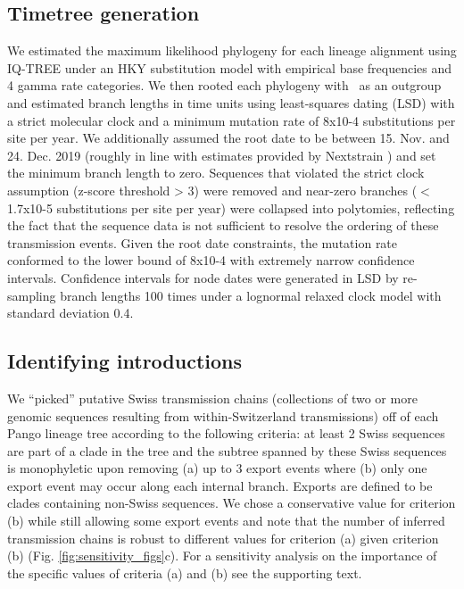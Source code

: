 \documentclass[11pt,twoside,lineno]{pnas-new} %
\begin{document}
\subsection*{Timetree generation}
We estimated the maximum likelihood phylogeny for each lineage alignment using IQ-TREE \cite{Nguyen2014} under an HKY substitution model \cite{Hasegawa1985} with empirical base frequencies and 4 gamma rate categories. We then rooted each phylogeny with \outgroupgisaidepiisls\ as an outgroup and estimated branch lengths in time units using least-squares dating (LSD) \cite{To2016} with a strict molecular clock and a minimum mutation rate of 8x10-4 substitutions per site per year. We additionally assumed the root date to be between 15. Nov. and 24. Dec. 2019 (roughly in line with estimates provided by Nextstrain \cite{Nextstrainteam}) and set the minimum branch length to zero. Sequences that violated the strict clock assumption (z-score threshold > 3) were removed and near-zero branches ($<$1.7x10-5 substitutions per site per year) were collapsed into polytomies, reflecting the fact that the sequence data is not sufficient to resolve the ordering of these transmission events. Given the root date constraints, the mutation rate conformed to the lower bound of 8x10-4 with extremely narrow confidence intervals. Confidence intervals for node dates were generated in LSD by re- sampling branch lengths 100 times under a lognormal relaxed clock model with standard deviation 0.4.

\subsection*{Identifying introductions}
We ``picked'' putative Swiss transmission chains (collections of two or more genomic sequences resulting from within-Switzerland transmissions) off of each Pango lineage tree according to the following criteria: at least 2 Swiss sequences are part of a clade in the tree and the subtree spanned by these Swiss sequences is monophyletic upon removing (a) up to 3 export events where (b) only one export event may occur along each internal branch. Exports are defined to be clades containing non-Swiss sequences. We chose a conservative value for criterion (b) while still allowing some export events and note that the number of inferred transmission chains is robust to different values for criterion (a) given criterion (b) (Fig. \ref{fig:sensitivity_figs}c). For a sensitivity analysis on the importance of the specific values of criteria (a) and (b) see the supporting text.
\end{document}
